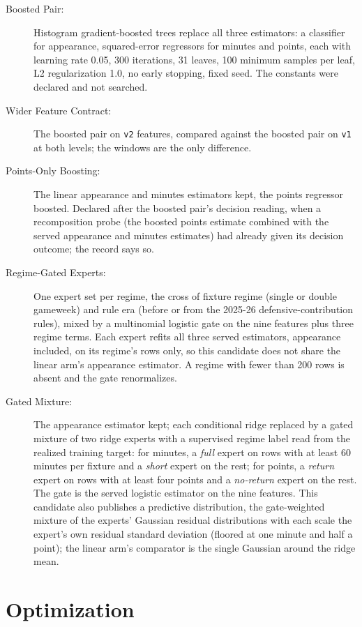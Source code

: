 \documentclass[11pt,a4paper]{article}
\begin{document}
\begin{description}
\item[Boosted Pair:] Histogram gradient-boosted trees replace all three estimators: a classifier for appearance, squared-error regressors for minutes and points, each with learning rate 0.05, 300 iterations, 31 leaves, 100 minimum samples per leaf, L2 regularization 1.0, no early stopping, fixed seed. The constants were declared and not searched.
\item[Wider Feature Contract:] The boosted pair on \texttt{v2} features, compared against the boosted pair on \texttt{v1} at both levels; the windows are the only difference.
\item[Points-Only Boosting:] The linear appearance and minutes estimators kept, the points regressor boosted. Declared after the boosted pair's decision reading, when a recomposition probe (the boosted points estimate combined with the served appearance and minutes estimates) had already given its decision outcome; the record says so.
\item[Regime-Gated Experts:] One expert set per regime, the cross of fixture regime (single or double gameweek) and rule era (before or from the 2025-26 defensive-contribution rules), mixed by a multinomial logistic gate on the nine features plus three regime terms. Each expert refits all three served estimators, appearance included, on its regime's rows only, so this candidate does not share the linear arm's appearance estimator. A regime with fewer than 200 rows is absent and the gate renormalizes.
\item[Gated Mixture:] The appearance estimator kept; each conditional ridge replaced by a gated mixture of two ridge experts with a supervised regime label read from the realized training target: for minutes, a \emph{full} expert on rows with at least 60 minutes per fixture and a \emph{short} expert on the rest; for points, a \emph{return} expert on rows with at least four points and a \emph{no-return} expert on the rest. The gate is the served logistic estimator on the nine features. This candidate also publishes a predictive distribution, the gate-weighted mixture of the experts' Gaussian residual distributions with each scale the expert's own residual standard deviation (floored at one minute and half a point); the linear arm's comparator is the single Gaussian around the ridge mean.
\end{description}


\section{Optimization}
\label{sec:opt}
\end{document}

